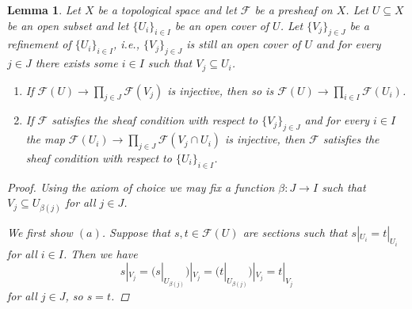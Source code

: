 \documentclass[12pt,reqno,a4paper]{amsart}
\theoremstyle{plain}
\newtheorem{lm}[thm]{Lemma}
\theoremstyle{definition}
\theoremstyle{remark}
\begin{document}
\begin{lm}\label{lm:refinement}
  Let $X$ be a topological space and let $\mathscr{F}$ be a presheaf on $X$.
  Let $U \subseteq X$ be an open subset and let $\{ U_{i} \}_{i \in I}$ be an open cover of $U$.
  Let $\{ V_{j} \}_{j \in J}$ be a refinement of $\{ U_{i} \}_{i \in I}$, i.e., $\{ V_{j} \}_{j \in J}$ is still an open cover of $U$ and for every $j \in J$ there exists some $i \in I$ such that $V_{j} \subseteq U_{i}$.
  \begin{enumerate}[label=(\alph*)]
    \item If $\mathscr{F}(U) \to \prod_{j \in J} \mathscr{F}(V_{j})$ is injective, then so is $\mathscr{F}(U) \to \prod_{i \in I} \mathscr{F}(U_{i})$.
    \item If $\mathscr{F}$ satisfies the sheaf condition with respect to $\{ V_{j} \}_{j \in J}$ and for every $i \in I$ the map $\mathscr{F}(U_{i}) \to \prod_{j \in J} \mathscr{F}(V_{j} \cap U_{i})$ is injective, then $\mathscr{F}$ satisfies the sheaf condition with respect to $\{ U_{i} \}_{i \in I}$.
  \end{enumerate}
  \begin{proof}
    Using the axiom of choice we may fix a function $\beta \colon J \to I$ such that $V_{j} \subseteq U_{\beta(j)}$ for all $j \in J$.

    We first show $(a)$.
    Suppose that $s, t \in \mathscr{F}(U)$ are sections such that $s|_{U_{i}} = t|_{U_{i}}$ for all $i \in I$.
    Then we have
    \[ s|_{V_{j}} = (s|_{U_{\beta(j)}})|_{V_{j}} = (t|_{U_{\beta(j)}})|_{V_{j}} = t|_{V_{j}} \]
    for all $j \in J$, so $s = t$.


\end{proof}
\end{lm}
\end{document}
